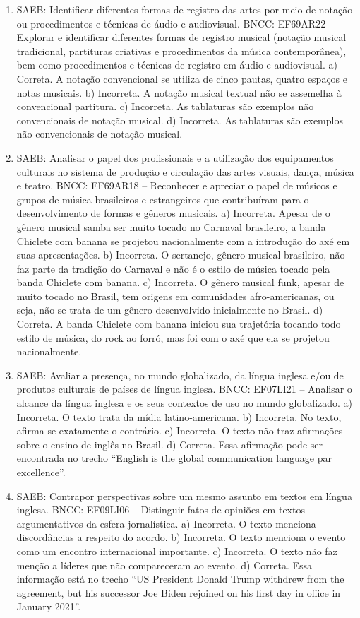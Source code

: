 \begin{enumerate}
\item
SAEB: Identificar diferentes formas de registro das artes por meio de
notação ou procedimentos e técnicas de áudio e audiovisual.
BNCC: EF69AR22 -- Explorar e identificar diferentes formas de registro
musical (notação musical tradicional, partituras criativas e
procedimentos da música contemporânea), bem como procedimentos e
técnicas de registro em áudio e audiovisual.
a) Correta. A notação convencional se utiliza de cinco pautas, quatro espaços e notas musicais.
b) Incorreta. A notação musical textual não se assemelha à convencional partitura.
c) Incorreta. As tablaturas são exemplos não convencionais de notação musical.
d) Incorreta. As tablaturas são exemplos não convencionais de notação musical.

\item
SAEB: Analisar o papel dos profissionais e a utilização dos
equipamentos culturais no sistema de produção e circulação das artes
visuais, dança, música e teatro.
BNCC: EF69AR18 -- Reconhecer e apreciar o papel de músicos e grupos de
música brasileiros e estrangeiros que contribuíram para o
desenvolvimento de formas e gêneros musicais.
a) Incorreta. Apesar de o gênero musical samba ser muito tocado no Carnaval brasileiro, a banda Chiclete 
com banana se projetou nacionalmente com a introdução do axé em suas apresentações.
b) Incorreta. O sertanejo, gênero musical brasileiro, não faz parte da
  tradição do Carnaval e não é o estilo de música tocado pela banda
Chiclete com banana.
c) Incorreta. O gênero musical funk, apesar de muito tocado no Brasil,
 tem origens em comunidades afro-americanas, ou seja, não se trata de um gênero desenvolvido inicialmente no
  Brasil.
d) Correta. A banda Chiclete com banana iniciou sua trajetória tocando
  todo estilo de música, do rock ao forró, mas foi com o axé que ela se
  projetou nacionalmente.

\item
SAEB: Avaliar a presença, no mundo globalizado, da língua inglesa e/ou
de produtos culturais de países de língua inglesa. BNCC: EF07LI21 --
Analisar o alcance da língua inglesa e os seus contextos de uso no mundo
globalizado.
a) Incorreta. O texto trata da mídia latino-americana. b) Incorreta. No
texto, afirma-se exatamente o contrário. c) Incorreta. O texto não traz
afirmações sobre o ensino de inglês no Brasil. d) Correta. Essa
afirmação pode ser encontrada no trecho ``English is the global
communication language par excellence''.

\item
SAEB: Contrapor perspectivas sobre um mesmo assunto em textos em língua
inglesa. BNCC: EF09LI06 -- Distinguir fatos de opiniões em textos
argumentativos da esfera jornalística.
a) Incorreta. O texto menciona discordâncias a respeito do acordo. b)
Incorreta. O texto menciona o evento como um encontro internacional
importante. c) Incorreta. O texto não faz menção a líderes que não
compareceram ao evento. d) Correta. Essa informação está no trecho ``US
President Donald Trump withdrew from the agreement, but his successor
Joe Biden rejoined on his first day in office in January 2021''.


\end{enumerate}
